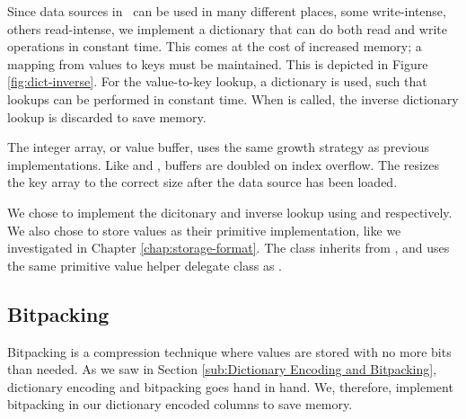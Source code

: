 Since data sources in \gap~can be used in many different places, some write-intense, others read-intense, we implement a dictionary that can do both read and write operations in constant time. This comes at the cost of increased memory; a mapping from values to keys must be maintained. This is depicted in Figure \ref{fig:dict-inverse}. For the value-to-key lookup, a dictionary is used, such that lookups can be performed in constant time. When  is called, the inverse dictionary lookup is discarded to save memory. 

The integer array, or value buffer, uses the same growth strategy as previous implementations. Like  and , buffers are doubled on index overflow. The  resizes the key array to the correct size after the data source has been loaded.

We chose to implement the dicitonary and inverse lookup using  and  respectively. We also chose to store values as their primitive implementation, like we investigated in Chapter \ref{chap:storage-format}. The class inherits from , and uses the same primitive value helper delegate class as .

\subsection{Bitpacking}
\label{sub:Bitpacking}
Bitpacking is a compression technique where values are stored with no more bits than needed. As we saw in Section \ref{sub:Dictionary Encoding and Bitpacking}, dictionary encoding and bitpacking goes hand in hand. We, therefore, implement bitpacking in our dictionary encoded columns to save memory.

